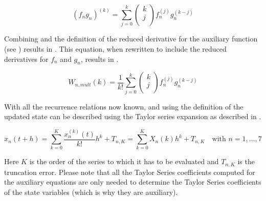 \begin{equation} \label{eq:Leibniz}
\left(f_{n}g_{n}\right)^{\left( k\right)}=\displaystyle\sum_{j=0}^{k}
\left(
\begin{matrix}
k\\
j\\
\end{matrix}
\right)
f_{n}^{\left( j\right)}g_{n}^{\left( k-j\right)}
\end{equation}

\noindent
Combining  and the definition of the reduced derivative for the auxiliary function (see ) results in . This equation, when rewritten to include the reduced derivatives for $f_{n}$ and $g_{n}$, results in .

\begin{equation} \label{eq:LeibnizInt}
W_{n,mult}\left(k\right)=\dfrac{1}{k!}\displaystyle\sum_{j=0}^{k}
\left(
\begin{matrix}
k\\
j\\
\end{matrix}
\right)
f_{n}^{\left( j\right)}g_{n}^{\left( k-j\right)}
\end{equation}

\noindent
With all the recurrence relations now known, and using the definition of  the updated state can be described using the Taylor series expansion as described in .

\begin{equation} \label{eq:TSexp}
x_{n}\left(t+h\right)=\displaystyle\sum_{k=0}^{K}\dfrac{x_{n}^{\left( k\right)}\left(t\right)}{k!}h^{k}+T_{n,K}=\displaystyle\sum_{k=0}^{K}X_{n}\left( k \right) h^{k}+T_{n,K} \quad \text{with }n=1,\dotsc,7
\end{equation}

\noindent
Here $K$ is the order of the series to which it has to be evaluated and $T_{n,K}$ is the truncation error. Please note that all the Taylor Series coefficients computed for the auxiliary equations are only needed to determine the Taylor Series coefficients of the state variables (which is why they are auxiliary).





%


%


